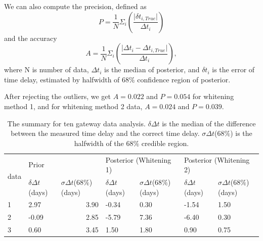 \documentclass[\docopts]{\docclass}
\begin{document}
We can also compute the precision, defined as 
\begin{equation}
P=\frac{1}{N} \Sigma_i (\frac{\lvert \delta t_{i, True} \rvert}{\Delta t_i})
\end{equation}
and the accuracy
\begin{equation}
A = \frac{1}{N} \Sigma_i (\frac{\lvert \Delta t_i-\Delta t_{i, True} \rvert}{\Delta t_i}),
\end{equation}
where N is number of data, $\Delta t_i$ is the median of posterior, and $\delta t_i$ is the error of time delay, estimated by halfwidth of $68\%$ confidence region of posterior.  

After rejecting the outliers, we get $A=0.022$ and $P=0.054$ for whitening method 1, and for whitening method 2 data, $A=0.024$ and $P=0.039$. 


\begin{table}[ht!]
\centering
\caption{The summary for ten gateway data analysis. $\delta \Delta t$ is the median of the difference between the measured time delay and the correct time delay. $\sigma\Delta t$($68\%$) is the halfwidth of the $68\%$ credible region.}
\label{tab:summary}
\begin{tabular}{|l|l|r|l|l|l|l|}
\hline
\multicolumn{1}{|c|}{\multirow{2}{*}{data}} & \multicolumn{2}{l|}{Prior}                                                    & \multicolumn{2}{l|}{Posterior (Whitening 1)}              & \multicolumn{2}{l|}{Posterior (Whitening 2)}              \\ \cline{2-7} 
\multicolumn{1}{|c|}{}                      & $\delta\Delta t$(days) & \multicolumn{1}{l|}{$\sigma\Delta t$(68$\%$) (days)} & $\delta\Delta t$ (days) & $\sigma\Delta t$(68$\%$) (days) & $\delta\Delta t$ (days) & $\sigma\Delta t$(68$\%$) (days) \\ \hline
1                                           & 2.97                   & 3.90                                                 & -0.34                   & 0.30                            & -1.54                   & 1.50                            \\ \hline
2                                           & -0.09                  & 2.85                                                 & -5.79                   & 7.36                            & -6.40                   & 0.30                            \\ \hline
3                                           & 0.60                   & 3.45                                                 & 1.50                    & 1.80                            & 0.90                    & 0.75                            \\ \hline

\end{tabular}
\end{table}
\end{document}
